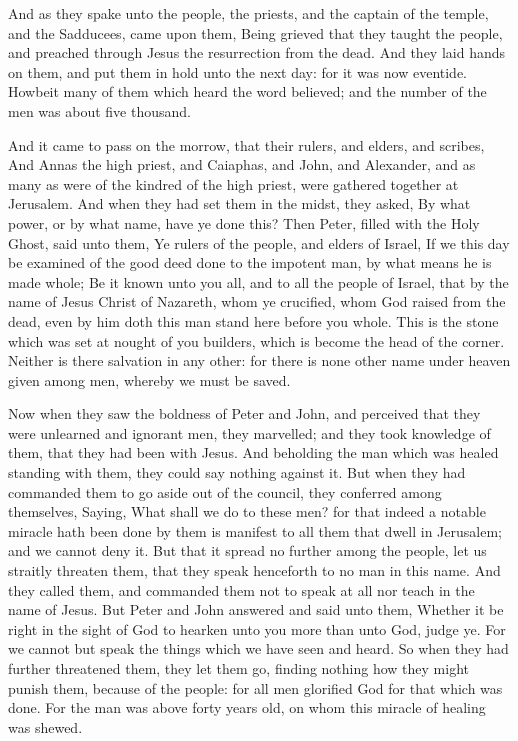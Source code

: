  And as they spake unto the people, the priests, and the
captain of the temple, and the Sadducees, came upon them, 
Being grieved that they taught the people, and preached through Jesus
the resurrection from the dead.  And they laid hands on
them, and put them in hold unto the next day: for it was now eventide.
 Howbeit many of them which heard the word believed; and the
number of the men was about five thousand.

 And it came to pass on the morrow, that their rulers, and
elders, and scribes,  And Annas the high priest, and
Caiaphas, and John, and Alexander, and as many as were of the kindred of
the high priest, were gathered together at Jerusalem.  And
when they had set them in the midst, they asked, By what power, or by
what name, have ye done this?  Then Peter, filled with the
Holy Ghost, said unto them, Ye rulers of the people, and elders of
Israel,  If we this day be examined of the good deed done to
the impotent man, by what means he is made whole;  Be it
known unto you all, and to all the people of Israel, that by the name of
Jesus Christ of Nazareth, whom ye crucified, whom God raised from the
dead, even by him doth this man stand here before you whole.
 This is the stone which was set at nought of you builders,
which is become the head of the corner.  Neither is there
salvation in any other: for there is none other name under heaven given
among men, whereby we must be saved.

 Now when they saw the boldness of Peter and John, and
perceived that they were unlearned and ignorant men, they marvelled; and
they took knowledge of them, that they had been with Jesus.
 And beholding the man which was healed standing with them,
they could say nothing against it.  But when they had
commanded them to go aside out of the council, they conferred among
themselves,  Saying, What shall we do to these men? for
that indeed a notable miracle hath been done by them is manifest to all
them that dwell in Jerusalem; and we cannot deny it.  But
that it spread no further among the people, let us straitly threaten
them, that they speak henceforth to no man in this name. 
And they called them, and commanded them not to speak at all nor teach
in the name of Jesus.  But Peter and John answered and said
unto them, Whether it be right in the sight of God to hearken unto you
more than unto God, judge ye.  For we cannot but speak the
things which we have seen and heard.  So when they had
further threatened them, they let them go, finding nothing how they
might punish them, because of the people: for all men glorified God for
that which was done.  For the man was above forty years
old, on whom this miracle of healing was shewed.

